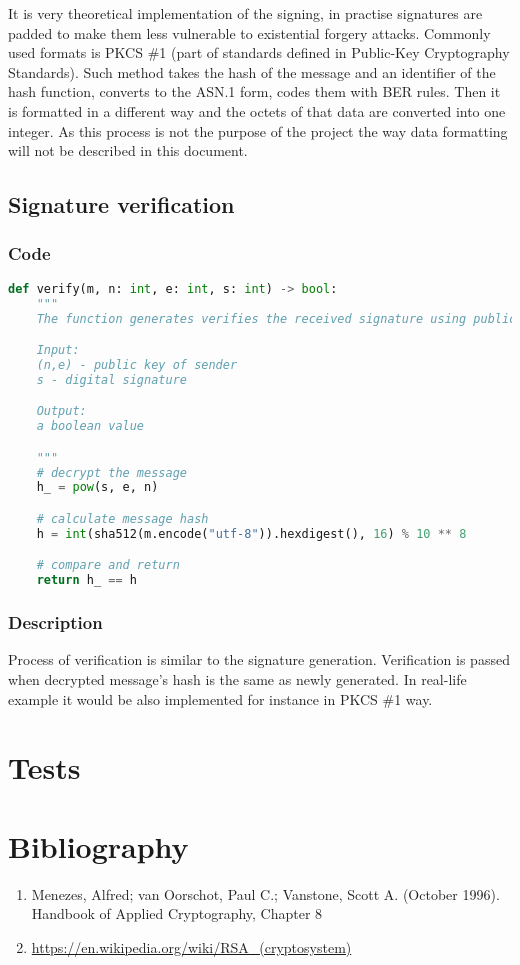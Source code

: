 \documentclass{article}
\begin{document}
It is very theoretical implementation of the signing, in practise signatures are padded
to make them less vulnerable to existential forgery attacks. Commonly used formats is PKCS \#1 (part
of standards defined in Public-Key Cryptography Standards). Such method takes the hash of the message and an
identifier of the hash function, converts to the ASN.1 form, codes them with BER rules. Then
it is formatted in a different way and the octets of that data are converted into one integer.
As this process is not the purpose of the project the way data formatting will not be described
in this document.

\subsection{Signature verification}
\subsubsection{Code}

\small

\begin{lstlisting}[language=Python]
    def verify(m, n: int, e: int, s: int) -> bool:
    """
    The function generates verifies the received signature using public key.

    Input:
    (n,e) - public key of sender
    s - digital signature

    Output:
    a boolean value

    """
    # decrypt the message
    h_ = pow(s, e, n)

    # calculate message hash
    h = int(sha512(m.encode("utf-8")).hexdigest(), 16) % 10 ** 8

    # compare and return
    return h_ == h    
\end{lstlisting}

\normalsize

\subsubsection{Description}
Process of verification is similar to the signature generation. Verification is passed when
decrypted message's hash is the same as newly generated. In real-life example it would be also
implemented for instance in PKCS \#1 way.

\section{Tests}

\section{Bibliography}
\begin{enumerate}
    \item  Menezes, Alfred; van Oorschot, Paul C.; Vanstone, Scott A. (October 1996). Handbook of Applied Cryptography, Chapter 8
    \item  \url{https://en.wikipedia.org/wiki/RSA_(cryptosystem)}
\end{enumerate}
\end{document}
